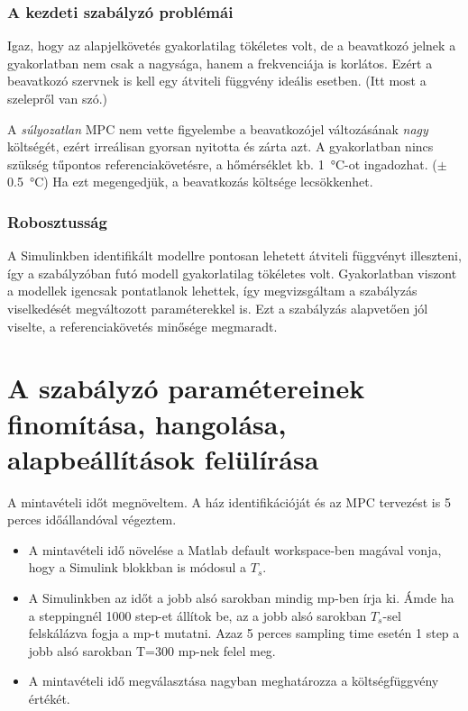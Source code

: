 \subsubsection{A kezdeti szabályzó problémái}
Igaz, hogy az alapjelkövetés gyakorlatilag tökéletes volt, de a beavatkozó jelnek a gyakorlatban nem csak a nagysága, hanem a frekvenciája is korlátos. Ezért a beavatkozó szervnek is kell egy átviteli függvény ideális esetben. (Itt most a szelepről van szó.)

A \textit{súlyozatlan} MPC nem vette figyelembe a beavatkozójel változásának \textit{nagy} költségét, ezért irreálisan gyorsan nyitotta és zárta azt.
A gyakorlatban nincs szükség tűpontos referenciakövetésre, a hőmérséklet kb. \SI{1}{\celsius}-ot ingadozhat. ($\pm$ \SI{0.5}{\celsius}) Ha ezt megengedjük, a beavatkozás költsége lecsökkenhet.

\subsubsection{Robosztusság}

A Simulinkben identifikált modellre pontosan lehetett átviteli függvényt illeszteni, így a szabályzóban futó modell gyakorlatilag tökéletes volt. Gyakorlatban viszont a modellek igencsak pontatlanok lehettek, így megvizsgáltam a szabályzás viselkedését megváltozott paraméterekkel is. Ezt a szabályzás alapvetően jól viselte, a referenciakövetés minősége megmaradt.

\section{A szabályzó paramétereinek finomítása, hangolása, alapbeállítások felülírása}

A mintavételi időt megnöveltem. A ház identifikációját és az MPC tervezést is 5 perces időállandóval végeztem.

\begin{itemize}[noitemsep,topsep=-8pt,parsep=0pt,partopsep=0pt]
	\item A mintavételi idő növelése a Matlab default workspace-ben magával vonja, hogy a Simulink blokkban is módosul a $T_s$. 
	\item A Simulinkben az időt a jobb alsó sarokban mindig mp-ben írja ki. Ámde ha a steppingnél 1000 step-et állítok be, az a jobb alsó sarokban $T_s$-sel felskálázva fogja a mp-t mutatni. Azaz 5 perces sampling time esetén 1 step a jobb alsó sarokban T=300 mp-nek felel meg.
	\item A mintavételi idő megválasztása nagyban meghatározza a költségfüggvény értékét.
\end{itemize}



